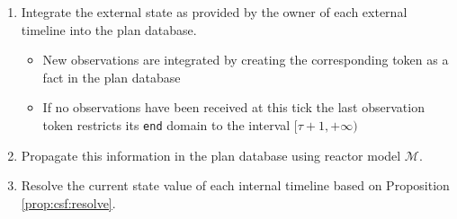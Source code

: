 \begin{enumerate}

\item Integrate the external state as provided by the owner of each
  external timeline into the plan database.

  \begin{itemize}

  \item New observations are integrated by creating the
    corresponding token as a fact in the plan database

  \item If no observations have been received at this tick the last
    observation token restricts its \texttt{end} domain to the
    interval $[\tau+1, +\infty)$

  \end{itemize}

\item \label{itm2} Propagate this information in the plan database
  using reactor model $\mathcal{M}$.

\item \label{itm3} Resolve the current state value of each internal
  timeline based on Proposition \ref{prop:csf:resolve}.

\end{enumerate}



